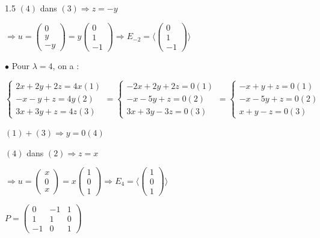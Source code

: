 \documentclass[12pt]{article}
\begin{document}
\begin{spacing}{1.5}
$(4)$ dans $(3)\Longrightarrow z=-y$

$\Rightarrow u=\begin{pmatrix}
0\\
y\\
-y
\end{pmatrix}=y\begin{pmatrix}
0\\
1\\
-1
\end{pmatrix}\Rightarrow E_{-2}=\langle \begin{pmatrix}
0 \\
1 \\
-1
\end{pmatrix}\rangle$

$\bullet$ Pour $\lambda=4$, on a :

$\begin{cases}
2x+2y+2z=4x(1)\\
-x-y+z=4y(2)\\
3x+3y+z=4z(3)
\end{cases}=\begin{cases}
-2x+2y+2z=0(1)\\
-x-5y+z=0(2)\\
3x+3y-3z=0(3)
\end{cases}=\begin{cases}
-x+y+z=0(1)\\
-x-5y+z=0(2)\\
x+y-z=0(3)
\end{cases}$

$(1)+(3)\Rightarrow y=0 (4)$

$(4)$ dans $(2)\Longrightarrow z=x$

$\Rightarrow u=\begin{pmatrix}
x\\
0\\
x
\end{pmatrix}=x\begin{pmatrix}
1\\
0\\
1
\end{pmatrix}\Rightarrow E_{4}=\langle \begin{pmatrix}
1\\
0\\
1
\end{pmatrix}\rangle$

$P=\begin{pmatrix}
0  & -1 & 1 \\ 
1  & 1  & 0 \\ 
-1 & 0  & 1
\end{pmatrix} $


\end{spacing}
\end{document}
